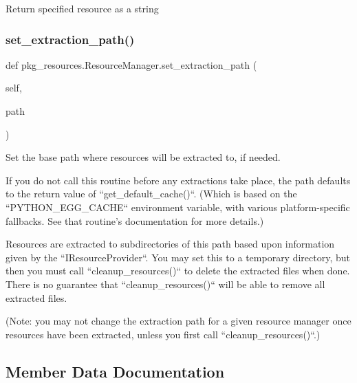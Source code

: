 \begin{DoxyVerb}Return specified resource as a string\end{DoxyVerb}
 \mbox{\label{classpkg__resources_1_1ResourceManager_aa07a3bbaed612c6837984c00c8d162eb}} 
\subsubsection{\texorpdfstring{set\+\_\+extraction\+\_\+path()}{set\_extraction\_path()}}
{\footnotesize\ttfamily def pkg\+\_\+resources.\+Resource\+Manager.\+set\+\_\+extraction\+\_\+path (\begin{DoxyParamCaption}\item[{}]{self,  }\item[{}]{path }\end{DoxyParamCaption})}

\begin{DoxyVerb}Set the base path where resources will be extracted to, if needed.

If you do not call this routine before any extractions take place, the
path defaults to the return value of ``get_default_cache()``.  (Which
is based on the ``PYTHON_EGG_CACHE`` environment variable, with various
platform-specific fallbacks.  See that routine's documentation for more
details.)

Resources are extracted to subdirectories of this path based upon
information given by the ``IResourceProvider``.  You may set this to a
temporary directory, but then you must call ``cleanup_resources()`` to
delete the extracted files when done.  There is no guarantee that
``cleanup_resources()`` will be able to remove all extracted files.

(Note: you may not change the extraction path for a given resource
manager once resources have been extracted, unless you first call
``cleanup_resources()``.)
\end{DoxyVerb}
 

\subsection{Member Data Documentation}
\mbox{\label{classpkg__resources_1_1ResourceManager_a73e8a505d671a5662efa4f9213a32c32}} 
